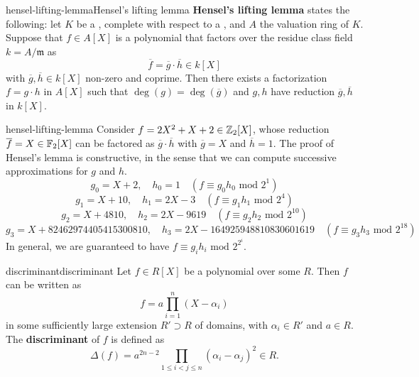     

\begin{topic}{hensel-lifting-lemma}{Hensel's lifting lemma}
    \textbf{Hensel's lifting lemma} states the following: let $K$ be a , complete with respect to a  , and $A$ the valuation ring of $K$. Suppose that $f \in A[X]$ is a polynomial that factors over the residue class field $k = A / \mathfrak{m}$ as
    \[ \overline{f} = \overline{g} \cdot \overline{h} \in k[X] \]
    with $\overline{g}, \overline{h} \in k[X]$ non-zero and coprime. Then there exists a factorization $f = g \cdot h$ in $A[X]$ such that $\deg(g) = \deg(\overline{g})$ and $g, h$ have reduction $\overline{g}, \overline{h}$ in $k[X]$.
\end{topic}

\begin{example}{hensel-lifting-lemma}
    Consider $f = 2X^2 + X + 2 \in \mathbb{Z}_2[X]$, whose reduction $\overline{f} = X \in \mathbb{F}_2[X]$ can be factored as $\overline{g} \cdot \overline{h}$ with $\overline{g} = X$ and $\overline{h} = 1$. The proof of Hensel's lemma is constructive, in the sense that we can compute successive approximations for $g$ and $h$.
    \[ g_0 = X + 2, \quad h_0 = 1 \quad (f \equiv g_0 h_0 \text{ mod } 2^1) \]
    \[ g_1 = X + 10, \quad h_1 = 2X - 3 \quad (f \equiv g_1 h_1 \text{ mod } 2^4) \]
    \[ g_2 = X + 4810, \quad h_2 = 2X - 9619 \quad (f \equiv g_2 h_2 \text{ mod } 2^{10}) \]
    \[ g_3 = X + 82462974405415300810, \quad h_3 = 2X - 164925948810830601619 \quad (f \equiv g_3 h_3 \text{ mod } 2^{18}) \]
    In general, we are guaranteed to have $f \equiv g_i h_i \text{ mod } 2^{2^i}$.
\end{example}

\begin{topic}{discriminant}{discriminant}
    Let $f \in R[X]$ be a polynomial over some  $R$. Then $f$ can be written as
    \[ f = a \prod_{i = 1}^n (X - \alpha_i) \]
    in some sufficiently large extension $R' \supset R$ of domains, with $\alpha_i \in R'$ and $a \in R$. The \textbf{discriminant} of $f$ is defined as
    \[ \Delta(f) = a^{2n - 2} \prod_{1 \le i < j \le n} (\alpha_i - \alpha_j)^2 \in R . \]
\end{topic}

